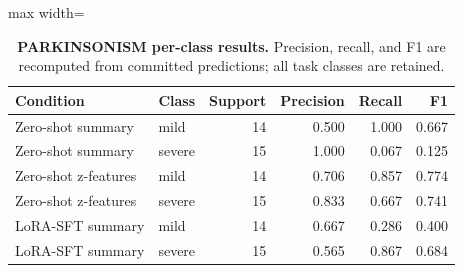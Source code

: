\begin{table}[H]
\centering
\caption{\textbf{PARKINSONISM per-class results.} Precision, recall, and F1 are recomputed from committed predictions; all task classes are retained.}
\label{tab:per_class_parkinsonism}
\small
\begin{adjustbox}{max width=\textwidth}
\begin{tabular}{llrrrr}
\toprule
Condition & Class & Support & Precision & Recall & F1 \\
\midrule
Zero-shot summary & mild & 14 & 0.500 & 1.000 & 0.667 \\
Zero-shot summary & severe & 15 & 1.000 & 0.067 & 0.125 \\
Zero-shot z-features & mild & 14 & 0.706 & 0.857 & 0.774 \\
Zero-shot z-features & severe & 15 & 0.833 & 0.667 & 0.741 \\
LoRA-SFT summary & mild & 14 & 0.667 & 0.286 & 0.400 \\
LoRA-SFT summary & severe & 15 & 0.565 & 0.867 & 0.684 \\
\bottomrule
\end{tabular}
\end{adjustbox}
\end{table}
